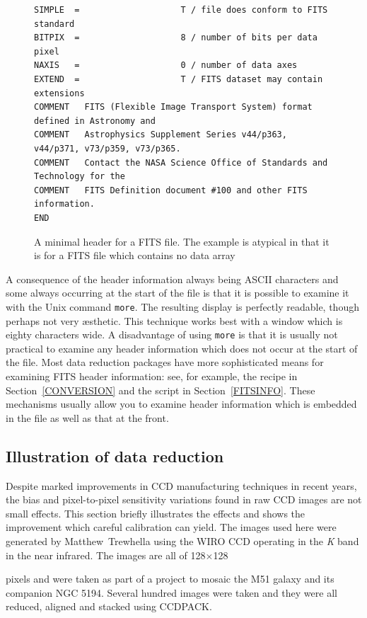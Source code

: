 \documentclass[twoside,11pt]{article}
\newcommand{\html}[1]{}
\newcommand{\latex}[1]{#1}
\begin{document}
\begin{figure}[htbp]

\begin{verbatim}
SIMPLE  =                    T / file does conform to FITS standard
BITPIX  =                    8 / number of bits per data pixel
NAXIS   =                    0 / number of data axes
EXTEND  =                    T / FITS dataset may contain extensions
COMMENT   FITS (Flexible Image Transport System) format defined in Astronomy and
COMMENT   Astrophysics Supplement Series v44/p363, v44/p371, v73/p359, v73/p365.
COMMENT   Contact the NASA Science Office of Standards and Technology for the
COMMENT   FITS Definition document #100 and other FITS information.
END
\end{verbatim}

\begin{quote}
\caption[A minimal FITS file header]{A minimal header for a FITS
file.  The example is atypical in that it is for a FITS file which
contains no data array
\label{FITSHEAD} }
\end{quote}

\end{figure}

A consequence of the header information always being ASCII characters
and some always occurring at the start of the file is that it is possible
to examine it with the Unix command {\tt more}.  The resulting display is
perfectly readable, though perhaps not very \ae sthetic.  This technique
works best with a window which is eighty characters wide.  A disadvantage
of using {\tt more} is that it is usually not practical to examine any
header information which does not occur at the start of the file.  Most
data reduction packages have more sophisticated means for examining FITS
header information: see, for example, the recipe in Section~\ref{CONVERSION}
and the script in Section~\ref{FITSINFO}.  These mechanisms usually allow
you to examine header information which is embedded in the file as well
as that at the front.

\subsection{Illustration of data reduction}

Despite marked improvements in CCD manufacturing techniques in recent
years, the bias and pixel-to-pixel sensitivity variations found in raw
CCD images are not small effects.  This section briefly illustrates the
effects and shows the improvement which careful calibration can yield.
The images used here were generated by Matthew~Trewhella using the WIRO CCD
operating in the {\it K}\/ band in the near infrared.  The images are all of
\latex{128$\times$128}
\html{128x128}
pixels and were taken as part of a project to mosaic the M51 galaxy
and its companion NGC 5194.  Several hundred images were taken and they were
all reduced, aligned and stacked using CCDPACK.
\end{document}

